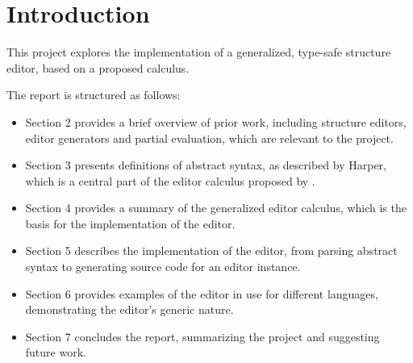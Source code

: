 \section{Introduction}

This project explores the implementation of a generalized, type-safe structure editor, based on a proposed calculus\cite{aalborg}.

The report is structured as follows:

\begin{itemize}
    \item Section 2 provides a brief overview of prior work, including structure editors, editor generators and partial evaluation, which are relevant to the project.
    \item Section 3 presents definitions of abstract syntax, as described by Harper\cite{harper}, which is a central part of the editor calculus proposed by \cite{aalborg}.
    \item Section 4 provides a summary of the generalized editor calculus\cite{aalborg}, which is the basis for the implementation of the editor.
    \item Section 5 describes the implementation of the editor, from parsing abstract syntax to generating source code for an editor instance.
    \item Section 6 provides examples of the editor in use for different languages, demonstrating the editor's generic nature.
    \item Section 7 concludes the report, summarizing the project and suggesting future work.
\end{itemize}